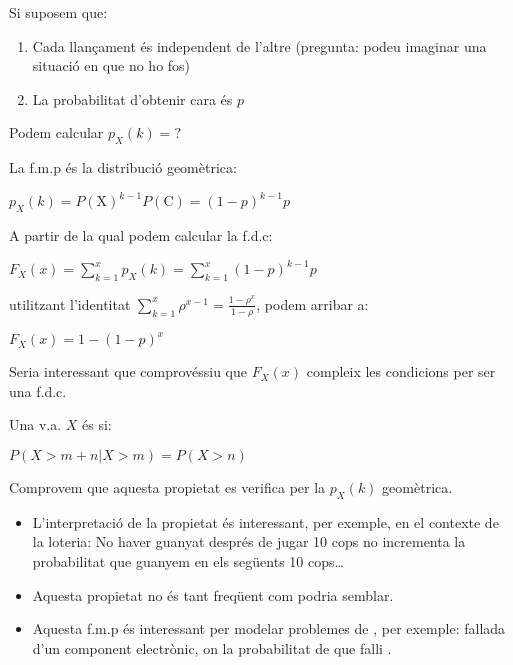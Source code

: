 \documentclass[letterpaper,10pt,english]{sphinxmanual}
\begin{document}
Si suposem que:
\begin{enumerate}
%
\item {} 
Cada llançament és independent de l’altre (pregunta: podeu imaginar una situació en que no ho fos)

\item {} 
La probabilitat d’obtenir cara és \(p\)

\end{enumerate}

Podem calcular \(p_X\left(k\right)=?\)

La f.m.p és la distribució geomètrica:

\(p_X\left(k\right) = P\left(\mbox{X}\right)^{k-1}P\left(\mbox{C}\right) = \left(1-p\right)^{k-1}p\)

A partir de la qual podem calcular la f.d.c:

\(F_X\left(x\right) = \sum_{k=1}^x p_X\left(k\right) = \sum_{k=1}^x \left(1-p\right)^{k-1}p\)

utilitzant l’identitat \(\sum_{k=1}^x \rho^{x-1}=\frac{1-\rho^x}{1-\rho}\), podem arribar a:

\(F_X\left(x\right) = 1 - \left(1-p\right)^x\)

Seria interessant que comprovéssiu que \(F_X\left(x\right)\) compleix les condicions per
ser una f.d.c.

Una v.a. \(X\) és  si:

\(P\left(X > m+n | X > m\right) = P\left(X > n \right)\)

 Comprovem que aquesta propietat es verifica per la \(p_X\left(k\right)\) geomètrica.
\begin{itemize}
\item {} 
L’interpretació de la propietat és interessant, per exemple, en el contexte de la loteria: No haver guanyat després de jugar 10 cops no incrementa la probabilitat que guanyem en els següents 10 cops…

\item {} 
Aquesta propietat no és tant freqüent com podria semblar.

\item {} 
Aquesta f.m.p és interessant per modelar problemes de , per exemple: fallada d’un component electrònic, on la probabilitat de que falli .

\end{itemize}
\end{document}
